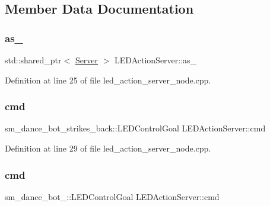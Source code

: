\subsection{Member Data Documentation}
\mbox{\label{classLEDActionServer_a61d21c77642081acf017d4ebd65b2de0}} 
\subsubsection{\texorpdfstring{as\+\_\+}{as\_}}
{\footnotesize\ttfamily std\+::shared\+\_\+ptr$<$ \hyperlink{odom__tracker__node_8cpp_a9884574d0480319430f628f79afc0500}{Server} $>$ L\+E\+D\+Action\+Server\+::as\+\_\+}



Definition at line 25 of file led\+\_\+action\+\_\+server\+\_\+node.\+cpp.

\mbox{\label{classLEDActionServer_a219e3a4ae2a09887d601bc9b210294dd}} 
\subsubsection{\texorpdfstring{cmd}{cmd}\hspace{0.1cm}{\footnotesize\ttfamily [1/3]}}
{\footnotesize\ttfamily sm\+\_\+dance\+\_\+bot\+\_\+strikes\+\_\+back\+::\+L\+E\+D\+Control\+Goal L\+E\+D\+Action\+Server\+::cmd}



Definition at line 29 of file led\+\_\+action\+\_\+server\+\_\+node.\+cpp.

\mbox{\label{classLEDActionServer_a754ac14e0c9bde99ae28feb59c0801c0}} 
\subsubsection{\texorpdfstring{cmd}{cmd}\hspace{0.1cm}{\footnotesize\ttfamily [2/3]}}
{\footnotesize\ttfamily sm\+\_\+dance\+\_\+bot\+\_\+::\+L\+E\+D\+Control\+Goal L\+E\+D\+Action\+Server\+::cmd}




